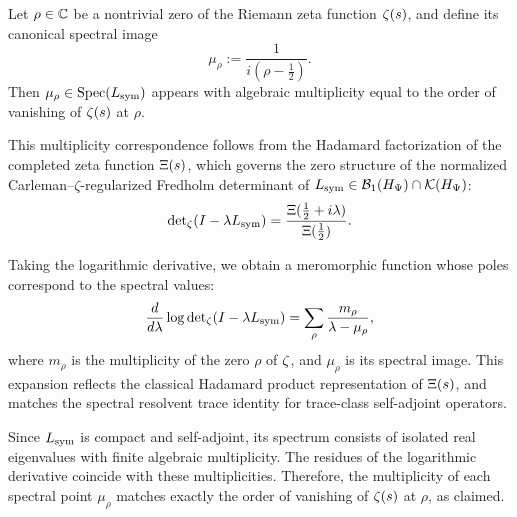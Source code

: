\begin{lemma}
\label{lem:multiplicity_preservation}

Let \( \rho \in \mathbb{C} \) be a nontrivial zero of the Riemann zeta function \( \zeta(s) \), and define its canonical spectral image
\[
\mu_\rho := \frac{1}{i(\rho - \tfrac{1}{2})}.
\]
Then \( \mu_\rho \in \operatorname{Spec}(L_{\mathrm{sym}}) \) appears with algebraic multiplicity equal to the order of vanishing of \( \zeta(s) \) at \( \rho \).

\medskip

\noindent
This multiplicity correspondence follows from the Hadamard factorization of the completed zeta function \( \Xi(s) \), which governs the zero structure of the normalized Carleman–\(\zeta\)-regularized Fredholm determinant of \( L_{\mathrm{sym}} \in \mathcal{B}_1(H_{\Psi}) \cap \mathcal{K}(H_{\Psi}) \):
\[
\det\nolimits_\zeta(I - \lambda L_{\mathrm{sym}}) = \frac{\Xi(\tfrac{1}{2} + i\lambda)}{\Xi(\tfrac{1}{2})}.
\]

Taking the logarithmic derivative, we obtain a meromorphic function whose poles correspond to the spectral values:
\[
\frac{d}{d\lambda} \log \det\nolimits_{\zeta}(I - \lambda L_{\mathrm{sym}}) = \sum_{\rho} \frac{m_\rho}{\lambda - \mu_\rho},
\]
where \( m_\rho \) is the multiplicity of the zero \( \rho \) of \( \zeta \), and \( \mu_\rho \) is its spectral image. This expansion reflects the classical Hadamard product representation of \( \Xi(s) \), and matches the spectral resolvent trace identity for trace-class self-adjoint operators.

\medskip

\noindent
Since \( L_{\mathrm{sym}} \) is compact and self-adjoint, its spectrum consists of isolated real eigenvalues with finite algebraic multiplicity. The residues of the logarithmic derivative coincide with these multiplicities. Therefore, the multiplicity of each spectral point \( \mu_\rho \) matches exactly the order of vanishing of \( \zeta(s) \) at \( \rho \), as claimed.
\end{lemma}
